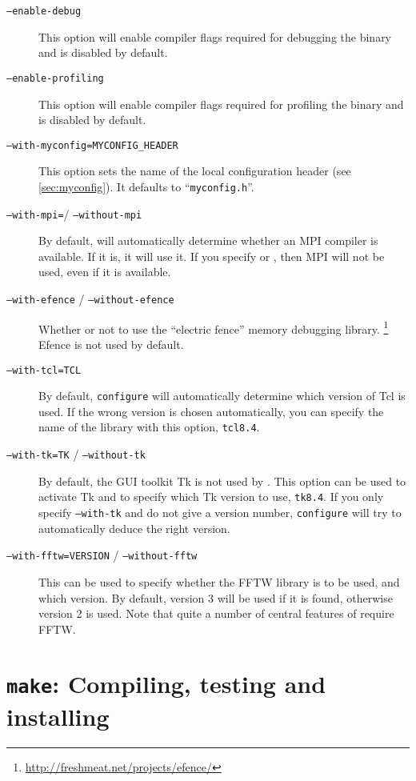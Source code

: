 \begin{description}
\item[\texttt{--enable-debug}] This option will enable compiler flags
  required for debugging the \es binary and is disabled by default.
\item[\texttt{--enable-profiling}] This option will enable compiler
  flags required for profiling the \es binary and is disabled by
  default.
\item[\texttt{--with-myconfig=MYCONFIG\_HEADER}] This option sets the
  name of the local configuration header (see \vref{sec:myconfig}). It
  defaults to ``\texttt{myconfig.h}''.
\item[\texttt{--with-mpi=}/ \texttt{--without-mpi}] By default,
   will automatically determine whether an MPI
  compiler is available.  If it is, it will use it.  If you specify
   or , then MPI will
  not be used, even if it is available.
\item[\texttt{--with-efence} / \texttt{--without-efence}] Whether or
  not to use the ``electric fence'' memory debugging library.
  \footnote{\url{http://freshmeat.net/projects/efence/}} Efence is not
  used by default.
\item[\texttt{--with-tcl=TCL}] By default, \texttt{configure} will
  automatically determine which version of Tcl is used.  If the wrong
  version is chosen automatically, you can specify the name of the
  library with this option, \eg{} \texttt{tcl8.4}.
\item[\texttt{--with-tk=TK} / \texttt{--without-tk}] By default, the
  GUI toolkit Tk is not used by \es. This option can be used to
  activate Tk and to specify which Tk version to use, \eg{}
  \texttt{tk8.4}. If you only specify \texttt{--with-tk} and do not
  give a version number, \texttt{configure} will try to automatically
  deduce the right version.
\item[\texttt{--with-fftw=VERSION} / \texttt{--without-fftw}] This can
  be used to specify whether the FFTW library is to be used, and which
  version.  By default, version 3 will be used if it is found,
  otherwise version 2 is used.  Note that quite a number of central
  features of \es require FFTW.
\end{description}

\section{\texttt{make}: Compiling,  testing and installing \es}
\label{sec:make}

